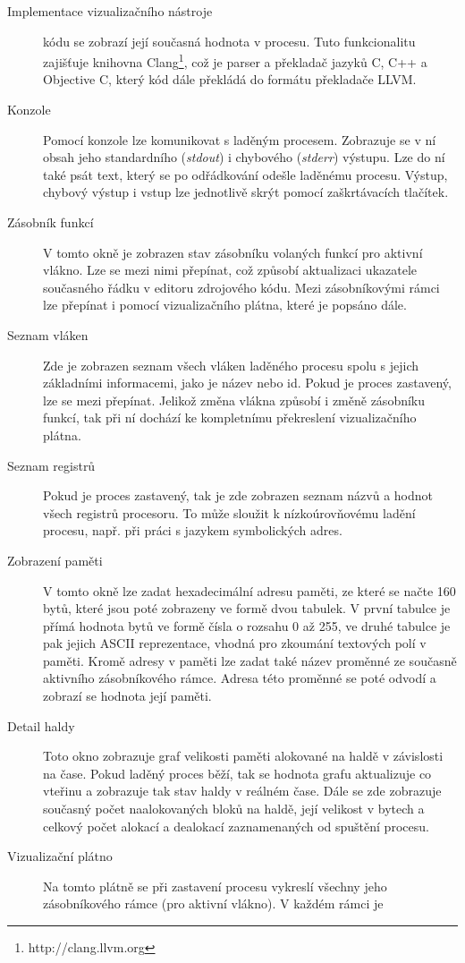 \documentclass[bc,male,python,dept460]{diploma}						%
\begin{document}
\begin{section}{Implementace vizualizačního nástroje}
\begin{description}
			kódu se zobrazí její současná hodnota v procesu. Tuto funkcionalitu zajišťuje knihovna Clang\footnote{http://clang.llvm.org}, což je parser a překladač
			jazyků C, C++ a Objective C, který kód dále překládá do formátu překladače LLVM.
		\item[Konzole] Pomocí konzole lze komunikovat s laděným procesem. Zobrazuje se v ní obsah jeho standardního (\textit{stdout}) i chybového (\textit{stderr})
			výstupu. Lze do ní také psát text, který se po odřádkování odešle laděnému procesu. Výstup, chybový výstup i vstup lze jednotlivě skrýt pomocí
			zaškrtávacích tlačítek.
		\item[Zásobník funkcí] V tomto okně je zobrazen stav zásobníku volaných funkcí pro aktivní vlákno. Lze se mezi nimi přepínat, což způsobí aktualizaci
			ukazatele současného řádku v editoru zdrojového kódu. Mezi zásobníkovými rámci lze přepínat i pomocí vizualizačního plátna, které je popsáno dále.
		\item[Seznam vláken] Zde je zobrazen seznam všech vláken laděného procesu spolu s jejich základními informacemi, jako je název nebo id. Pokud je proces
			zastavený, lze se mezi přepínat. Jelikož změna vlákna způsobí i změně zásobníku funkcí, tak při ní dochází ke kompletnímu překreslení vizualizačního
			plátna.
		\item[Seznam registrů]
			Pokud je proces zastavený, tak je zde zobrazen seznam názvů a hodnot všech registrů procesoru. To může sloužit k nízkoúrovňovému ladění procesu, např.
			při práci s jazykem symbolických adres.
		\item[Zobrazení paměti] V tomto okně lze zadat hexadecimální adresu paměti, ze které se načte 160 bytů, které jsou poté zobrazeny ve formě dvou tabulek.
			V první tabulce je přímá hodnota bytů ve formě čísla o rozsahu 0 až 255, ve druhé tabulce je pak jejich ASCII reprezentace, vhodná pro zkoumání textových
			polí v paměti. Kromě adresy v paměti lze zadat také název proměnné ze současně aktivního zásobníkového rámce. Adresa této proměnné se poté odvodí
			a zobrazí se hodnota její paměti.
		\item[Detail haldy]
			Toto okno zobrazuje graf velikosti paměti alokované na haldě v závislosti na čase. Pokud laděný proces běží, tak se hodnota grafu aktualizuje co vteřinu
			a zobrazuje tak stav haldy v reálném čase. Dále se zde zobrazuje současný počet naalokovaných bloků na haldě, její velikost v bytech a celkový počet
			alokací a dealokací zaznamenaných od spuštění procesu.
		\item[Vizualizační plátno] Na tomto plátně se při zastavení procesu vykreslí všechny jeho zásobníkového rámce (pro aktivní vlákno). V každém rámci je

\end{description}
\end{section}
\end{document}
